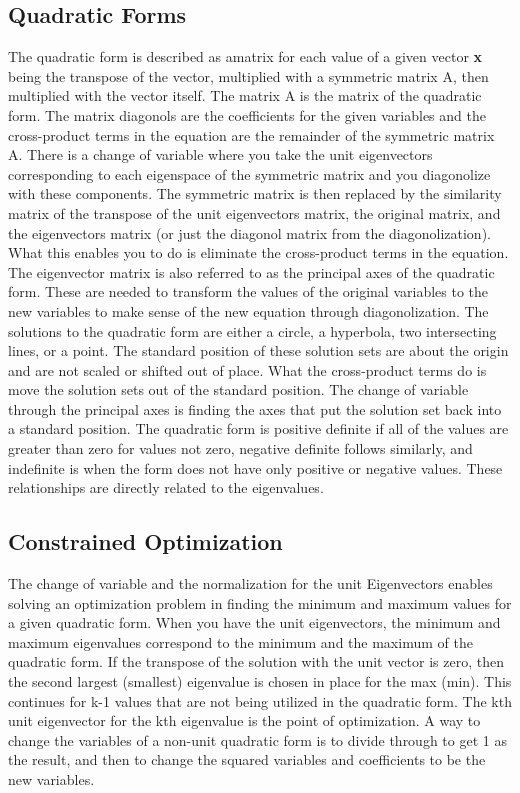 \documentclass[12pt]{article}
\begin{document}
\subsection{Quadratic Forms}
The quadratic form is described as amatrix for each value of a given vector \textbf{x} being the transpose of the vector, multiplied with a symmetric matrix A, then multiplied with 
the vector itself. The matrix A is the matrix of the quadratic form. The matrix diagonols are the coefficients for the given variables and the cross-product terms in the equation are 
the remainder of the symmetric matrix A. There is a change of variable where you take the unit eigenvectors corresponding to each eigenspace of the symmetric matrix and you diagonolize 
with these components. The symmetric matrix is then replaced by the similarity matrix of the transpose of the unit eigenvectors matrix, the original matrix, and the eigenvectors matrix 
(or just the diagonol matrix from the diagonolization). What this enables you to do is eliminate the cross-product terms in the equation. The eigenvector matrix is also referred to as 
the principal axes of the quadratic form. These are needed to transform the values of the original variables to the new variables to make sense of the new equation through diagonolization. 
\newline
\newline
The solutions to the quadratic form are either a circle, a hyperbola, two intersecting lines, or a point. The standard position of these solution sets are about the origin and are not 
scaled or shifted out of place. What the cross-product terms do is move the solution sets out of the standard position. The change of variable through the principal axes is finding the 
axes that put the solution set back into a standard position. The quadratic form is positive definite if all of the values are greater than zero for values not zero, negative definite 
follows similarly, and indefinite is when the form does not have only positive or negative values. These relationships are directly related to the eigenvalues. 
\subsection{Constrained Optimization} 
The change of variable and the normalization for the unit Eigenvectors enables solving an optimization problem in finding the minimum and maximum values for a given quadratic form. 
When you have the unit eigenvectors, the minimum and maximum eigenvalues correspond to the minimum and the maximum of the quadratic form. If the transpose of the solution with the unit 
vector is zero, then the second largest (smallest) eigenvalue is chosen in place for the max (min). This continues for k-1 values that are not being utilized in the quadratic form. The 
kth unit eigenvector for the kth eigenvalue is the point of optimization. A way to change the variables of a non-unit quadratic form is to divide through to get 1 as the result, and then 
to change the squared variables and coefficients to be the new variables. 
\end{document}
